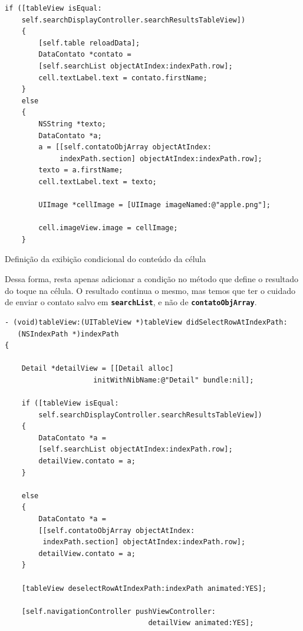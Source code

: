 \documentclass[a4paper,12pt,brazil,doubleside]{book}
\begin{document}
\begin{singlespace}
\begin{listing}[H]
\begin{verbatim}
if ([tableView isEqual:
    self.searchDisplayController.searchResultsTableView])
    {
        [self.table reloadData];
        DataContato *contato =
        [self.searchList objectAtIndex:indexPath.row];
        cell.textLabel.text = contato.firstName;
    }
    else
    {
        NSString *texto;
        DataContato *a;
        a = [[self.contatoObjArray objectAtIndex:
             indexPath.section] objectAtIndex:indexPath.row];
        texto = a.firstName;
        cell.textLabel.text = texto;
        
        UIImage *cellImage = [UIImage imageNamed:@"apple.png"];
        
        cell.imageView.image = cellImage;
    }
\end{verbatim}
\caption{Definição da exibição condicional do conteúdo da célula}
\end{listing}


Dessa forma, resta apenas adicionar a condição no método que define o resultado do toque na célula. O resultado continua o mesmo, mas temos que ter o cuidado de enviar o contato salvo em \texttt{\textbf{searchList}}, e não de \texttt{\textbf{contatoObjArray}}.

\begin{listing}[H]
\begin{verbatim}
- (void)tableView:(UITableView *)tableView didSelectRowAtIndexPath:
   (NSIndexPath *)indexPath
{

    Detail *detailView = [[Detail alloc]
                     initWithNibName:@"Detail" bundle:nil];
    
    if ([tableView isEqual:
        self.searchDisplayController.searchResultsTableView])
    {
        DataContato *a =
        [self.searchList objectAtIndex:indexPath.row];
        detailView.contato = a;
    }

    else
    {
        DataContato *a =
        [[self.contatoObjArray objectAtIndex:
         indexPath.section] objectAtIndex:indexPath.row];
        detailView.contato = a;
    }
    
    [tableView deselectRowAtIndexPath:indexPath animated:YES];
    
    [self.navigationController pushViewController:
                                  detailView animated:YES];
    

\end{verbatim}
\end{listing}
\end{singlespace}
\end{document}
